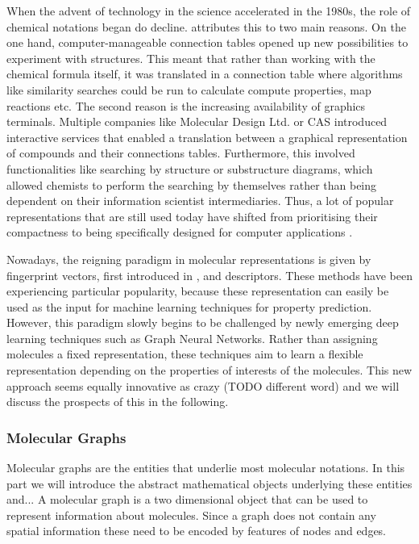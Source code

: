 When the advent of technology in the science accelerated in the 1980s, the role of chemical notations began do decline. \citep{Lawlor} attributes this to two main reasons. On the one hand, computer-manageable connection tables opened up new possibilities to experiment with structures. This meant that rather than working with the chemical formula itself, it was translated in a connection table where algorithms like similarity searches could be run to calculate compute properties, map reactions etc. 
The second reason is the increasing availability of graphics terminals. Multiple companies like Molecular Design Ltd. or CAS \citep{cas} introduced interactive services that enabled a translation between a graphical representation of compounds and their connections tables. Furthermore, this involved functionalities like searching by structure or substructure diagrams, which allowed chemists to perform the searching by themselves rather than being dependent on their information scientist intermediaries. Thus, a lot of popular representations that are still used today have shifted from prioritising their compactness to being specifically designed for computer applications \citep{smiles, heller2015inchi, cereto2015molecular}. 

Nowadays, the reigning paradigm in molecular representations is given by fingerprint vectors, first introduced in , and descriptors. These methods have been experiencing particular popularity, because these representation can easily be used as the input for machine learning techniques for property prediction. However, this paradigm slowly begins to be challenged by newly emerging deep learning techniques such as Graph Neural Networks.
Rather than assigning molecules a fixed representation, these techniques aim to learn a flexible representation depending on the properties of interests of the molecules. This new approach seems equally innovative as crazy (TODO different word) and we will discuss the prospects of this in the following. 
\subsubsection{Molecular Graphs}
Molecular graphs are the entities that underlie most molecular notations. In this part we will introduce the abstract mathematical objects underlying these entities and...
A molecular graph is a two dimensional object that can be used to represent information about molecules. Since a graph does not contain any spatial information these need to be encoded by features of nodes and edges. 

